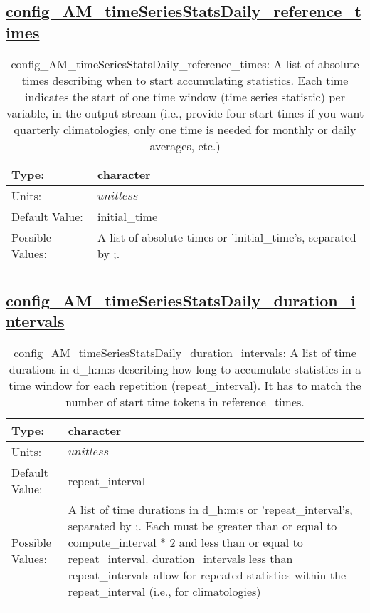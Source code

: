 \subsection[config\_AM\_timeSeriesStatsDaily\_reference\_times]{\hyperref[sec:nm_tab_AM_timeSeriesStatsDaily]{config\_AM\_timeSeriesStatsDaily\_reference\_times}}
\label{subsec:nm_sec_config_AM_timeSeriesStatsDaily_reference_times}
\begin{center}
\begin{longtable}{| p{2.0in} || p{4.0in} |}
    \hline
    Type: & character \\
    \hline
    Units: & $unitless$ \\
    \hline
    Default Value: & initial\_time \\
    \hline
    Possible Values: & A list of absolute times or 'initial\_time's, separated by ;. \\
    \hline
    \caption{config\_AM\_timeSeriesStatsDaily\_reference\_times: A list of absolute times describing when to start accumulating statistics. Each time indicates the start of one time window (time series statistic) per variable, in the output stream (i.e., provide four start times if you want quarterly climatologies, only one time is needed for monthly or daily averages, etc.)}
\end{longtable}
\end{center}
\subsection[config\_AM\_timeSeriesStatsDaily\_duration\_intervals]{\hyperref[sec:nm_tab_AM_timeSeriesStatsDaily]{config\_AM\_timeSeriesStatsDaily\_duration\_intervals}}
\label{subsec:nm_sec_config_AM_timeSeriesStatsDaily_duration_intervals}
\begin{center}
\begin{longtable}{| p{2.0in} || p{4.0in} |}
    \hline
    Type: & character \\
    \hline
    Units: & $unitless$ \\
    \hline
    Default Value: & repeat\_interval \\
    \hline
    Possible Values: & A list of time durations in d\_h:m:s or 'repeat\_interval's, separated by ;. Each must be greater than or equal to compute\_interval * 2 and less than or equal to repeat\_interval. duration\_intervals less than repeat\_intervals allow for repeated statistics within the repeat\_interval (i.e., for climatologies) \\
    \hline
    \caption{config\_AM\_timeSeriesStatsDaily\_duration\_intervals: A list of time durations in d\_h:m:s describing how long to accumulate statistics in a time window for each repetition (repeat\_interval). It has to match the number of start time tokens in reference\_times.}
\end{longtable}
\end{center}
